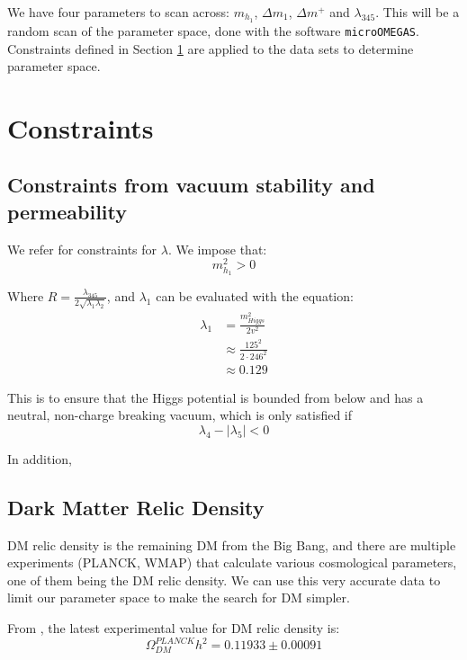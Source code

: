 \documentclass[12pt]{article}
\begin{document}
We have four parameters to scan across: $m_{h_1}$, $\Delta m_1$, $\Delta m^+$ and $\lambda_{345}$. This will be a random scan of the parameter space, done with the software \verb|microOMEGAS|. Constraints defined in Section \ref{sec:constraints} are applied to the data sets to determine parameter space.

\section{Constraints}
\label{sec:constraints}
\subsection{Constraints from vacuum stability and permeability}
We refer \cite{Belyaev:2016lok} for constraints for $\lambda$. We impose that:
\begin{equation}
m_{h_1}^2 >0
\end{equation}

Where $R = \frac{\lambda_{345}}{2\sqrt{\lambda_1\lambda_2}}$, and $\lambda_1$ can be evaluated with the equation:
\begin{align}
    \lambda_1 &= \frac{m^2_{Higgs}}{2 v^2}\\
                &\approx\frac{125^2}{2\cdot 246 ^ 2} \\
                &\approx0.129
\end{align}

This is to ensure that the Higgs potential is bounded from below and has a neutral, non-charge breaking vacuum, which is only satisfied if
\begin{equation}
    \lambda_4 - |\lambda_5| < 0
\end{equation}

In addition, 

\subsection{Dark Matter Relic Density}
\label{sec:relic density}
DM relic density is the remaining DM from the Big Bang, and there are multiple experiments (PLANCK, WMAP) that calculate various cosmological parameters, one of them being the DM relic density. We can use this very accurate data to limit our parameter space to make the search for DM simpler.

From \cite{Planck:2018vyg}, the latest experimental value for DM relic density is:
\begin{equation}
    \Omega ^{PLANCK}_{DM} h^2 = 0.11933 \pm 0.00091
\end{equation}
\end{document}
